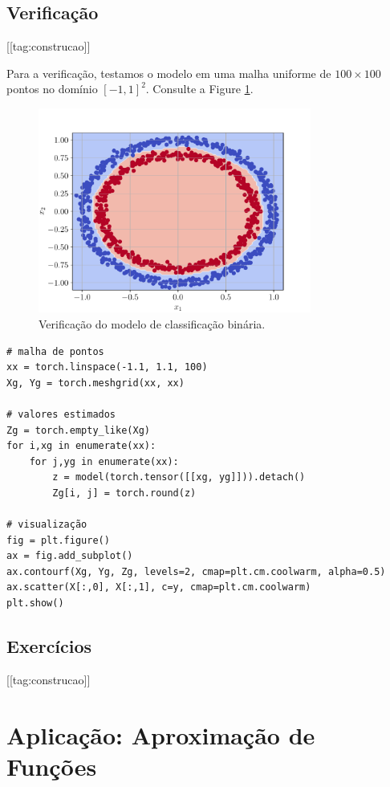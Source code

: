\subsection{Verificação}

[[tag:construcao]]

Para a verificação, testamos o modelo em uma malha uniforme de $100\times 100$ pontos no domínio $[-1, 1]^2$. Consulte a Figure \ref{cap_mlp_sec_classbin:fig:result}.

\begin{figure}[H]
  \centering
  \includegraphics[width=0.8\textwidth]{./cap_mlp/dados/fig_classbin_result/fig}
  \caption{Verificação do modelo de classificação binária.}
  \label{cap_mlp_sec_classbin:fig:result}
\end{figure}


\begin{lstlisting}
# malha de pontos
xx = torch.linspace(-1.1, 1.1, 100)
Xg, Yg = torch.meshgrid(xx, xx)

# valores estimados
Zg = torch.empty_like(Xg)
for i,xg in enumerate(xx):
    for j,yg in enumerate(xx):
        z = model(torch.tensor([[xg, yg]])).detach()
        Zg[i, j] = torch.round(z)

# visualização
fig = plt.figure()
ax = fig.add_subplot()
ax.contourf(Xg, Yg, Zg, levels=2, cmap=plt.cm.coolwarm, alpha=0.5)
ax.scatter(X[:,0], X[:,1], c=y, cmap=plt.cm.coolwarm)
plt.show()
\end{lstlisting}

\subsection{Exercícios}
[[tag:construcao]]


\section{Aplicação: Aproximação de Funções}\label{cap_mlp_sec_apfun}

